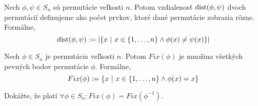 \begin{definition}
\label{def:permdist}
Nech $\phi, \psi \in S_n$ sú permutácie veľkosti $n$. 
Potom vzdialenosť ${\rm dist}(\phi, \psi)$ dvoch permutácií definujeme ako počet prvkov, ktoré dané permutácie zobrazia rôzne. 
Formálne, 
$${\rm dist}(\phi, \psi) := \left| \left\{x ~|~ x \in \left\{1, \ldots, n\right\} \wedge \phi(x) \neq \psi(x) \right\} \right| $$
\end{definition}

\begin{definition}
Nech $\phi \in S_n$ je permutácia veľkosti $n$. 
Potom $Fix(\phi)$ je množina všetkých pevných bodov permutácie $\phi$. 
Formálne, 
$$Fix(\phi) := \left\{x ~|~ x \in \left\{1, \ldots, n\right\} \wedge \phi(x) = x\right\}$$ 
\end{definition}


\begin{exercise}
Dokážte, že platí $\forall \phi \in S_n: Fix(\phi) = Fix(\phi^{-1})$.
\end{exercise}



